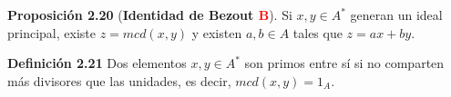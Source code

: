 \documentclass[a4paper, 11pt]{extarticle}
\newcommand{\propo}[1]{\textcolor{rojo}{\textbf{Proposición #1}}}
\newcommand{\defi}[1]{\textcolor{azul}{\textbf{Definición #1}}}
\begin{document}
\propo{2.20} (\textbf{Identidad de Bezout \textcolor{red}{B}}). Si \(x,y \in A^*\) 
generan un ideal principal, existe \(z = mcd(x,y)\) y existen \(a,b \in A\) 
tales que \(z = ax + by\).

\defi{2.21} Dos elementos \(x,y \in A^*\) son primos entre sí si no comparten
más divisores que las unidades, es decir, \(mcd(x,y) = 1_A\).

\vspace{-1em}
\begin{center}
\end{center}
\vspace{-1em}
\end{document}
